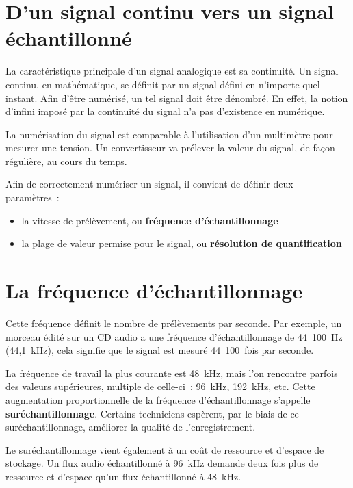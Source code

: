 \documentclass[
]{book}
\providecommand{\tightlist}{%
  \setlength{\itemsep}{0pt}\setlength{\parskip}{0pt}}
\begin{document}
\hypertarget{dun-signal-continu-vers-un-signal-uxe9chantillonnuxe9}{%
\section{D'un signal continu vers un signal échantillonné}\label{dun-signal-continu-vers-un-signal-uxe9chantillonnuxe9}}

La caractéristique principale d'un signal analogique est sa continuité. Un signal continu, en mathématique, se définit par un signal défini en n'importe quel instant. Afin d'être numérisé, un tel signal doit être dénombré. En effet, la notion d'infini imposé par la continuité du signal n'a pas d'existence en numérique.

La numérisation du signal est comparable à l'utilisation d'un multimètre pour mesurer une tension. Un convertisseur va prélever la valeur du signal, de façon régulière, au cours du temps.

Afin de correctement numériser un signal, il convient de définir deux paramètres~:

\begin{itemize}
\tightlist
\item
  la vitesse de prélèvement, ou \textbf{fréquence d'échantillonnage}
\item
  la plage de valeur permise pour le signal, ou \textbf{résolution de quantification}
\end{itemize}

\hypertarget{la-fruxe9quence-duxe9chantillonnage}{%
\section{La fréquence d'échantillonnage}\label{la-fruxe9quence-duxe9chantillonnage}}

Cette fréquence définit le nombre de prélèvements par seconde. Par exemple, un morceau édité sur un CD audio a une fréquence d'échantillonnage de 44~100~Hz (44,1~kHz), cela signifie que le signal est mesuré 44~100~fois par seconde.

La fréquence de travail la plus courante est 48~kHz, mais l'on rencontre parfois des valeurs supérieures, multiple de celle-ci~: 96~kHz, 192~kHz, etc. Cette augmentation proportionnelle de la fréquence d'échantillonnage s'appelle \textbf{suréchantillonnage}. Certains techniciens espèrent, par le biais de ce suréchantillonnage, améliorer la qualité de l'enregistrement.

Le suréchantillonnage vient également à un coût de ressource et d'espace de stockage. Un flux audio échantillonné à 96~kHz demande deux fois plus de ressource et d'espace qu'un flux échantillonné à 48~kHz.
\end{document}
